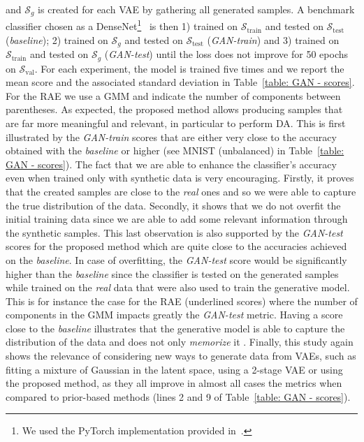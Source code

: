 \documentclass[10pt,journal,compsoc]{IEEEtran}
\begin{document}
and $\mathcal{S}_g$ is created for each VAE by gathering all generated samples. A benchmark classifier chosen as a DenseNet\footnote{We used the PyTorch implementation provided in~\cite{amos_bamosdensenetpytorch_2020}.}~\cite{huang_densely_2017} is then 1) trained on $\mathcal{S}_{\mathrm{train}}$ and tested on $\mathcal{S}_{\mathrm{test}}$ (\emph{baseline}); 2) trained on $\mathcal{S}_g$ and tested on $\mathcal{S}_{\mathrm{test}}$ (\emph{GAN-train}) and 3) trained on  $\mathcal{S}_{\mathrm{train}}$ and tested on $\mathcal{S}_g$ (\emph{GAN-test}) until the loss does not improve for 50 epochs on $\mathcal{S}_{\mathrm{val}}$. For each experiment, the model is trained five times and we report the mean score and the associated standard deviation in Table~\ref{table: GAN - scores}. For the RAE we use a GMM and indicate the number of components between parentheses. As expected, the proposed method allows producing samples that are far more meaningful and relevant, in particular to perform DA. This is first illustrated by the \emph{GAN-train} scores that are either very close to the accuracy obtained with the \emph{baseline} or higher (see MNIST (unbalanced) in Table~\ref{table: GAN - scores}). The fact that we are able to enhance the classifier's accuracy even when trained only with synthetic data is very encouraging. Firstly, it proves that the created samples are close to the \emph{real} ones and so we were able to capture the true distribution of the data. Secondly, it shows that we do not overfit the initial training data since we are able to add some relevant information through the synthetic samples. This last observation is also supported by the \emph{GAN-test} scores for the proposed method which are quite close to the accuracies achieved on the \emph{baseline}. In case of overfitting, the \emph{GAN-test} score would be significantly higher than the \emph{baseline} since the classifier is tested on the generated samples while trained on the \emph{real} data that were also used to train the generative model. This is for instance the case for the RAE (underlined scores) where the number of components in the GMM impacts greatly the \emph{GAN-test} metric. Having a score close to the \emph{baseline} illustrates that the generative model is able to capture the distribution of the data and does not only \emph{memorize} it \cite{shmelkov_how_2018}. Finally, this study again shows the relevance of considering new ways to generate data from VAEs, such as fitting a mixture of Gaussian in the latent space, using a 2-stage VAE or using the proposed method, as they all improve in almost all cases the metrics when compared to prior-based methods (lines 2 and 9 of Table~\ref{table: GAN - scores}).
\end{document}
